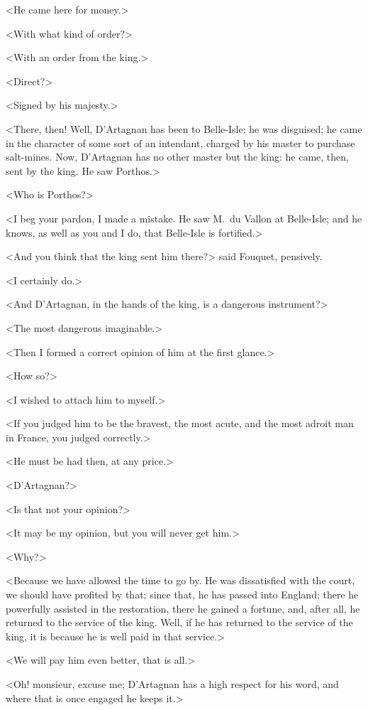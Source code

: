 <He came here for money.>

<With what kind of order?>

<With an order from the king.>

<Direct?>

<Signed by his majesty.>

<There, then! Well, D'Artagnan has been to Belle-Isle; he was disguised; he came in the character of some sort of an intendant, charged by his master to purchase salt-mines. Now, D'Artagnan has no other master but the king: he came, then, sent by the king. He saw Porthos.>

<Who is Porthos?>

<I beg your pardon, I made a mistake. He saw M.~du Vallon at Belle-Isle; and he knows, as well as you and I do, that Belle-Isle is fortified.>

<And you think that the king sent him there?> said Fouquet, pensively.

<I certainly do.>

<And D'Artagnan, in the hands of the king, is a dangerous instrument?>

<The most dangerous imaginable.>

<Then I formed a correct opinion of him at the first glance.>

<How so?>

<I wished to attach him to myself.>

<If you judged him to be the bravest, the most acute, and the most adroit man in France, you judged correctly.>

<He must be had then, at any price.>

<D'Artagnan?>

<Is that not your opinion?>

<It may be my opinion, but you will never get him.>

<Why?>

<Because we have allowed the time to go by. He was dissatisfied with the court, we should have profited by that; since that, he has passed into England; there he powerfully assisted in the restoration, there he gained a fortune, and, after all, he returned to the service of the king. Well, if he has returned to the service of the king, it is because he is well paid in that service.>

<We will pay him even better, that is all.>

<Oh! monsieur, excuse me; D'Artagnan has a high respect for his word, and where that is once engaged he keeps it.>


